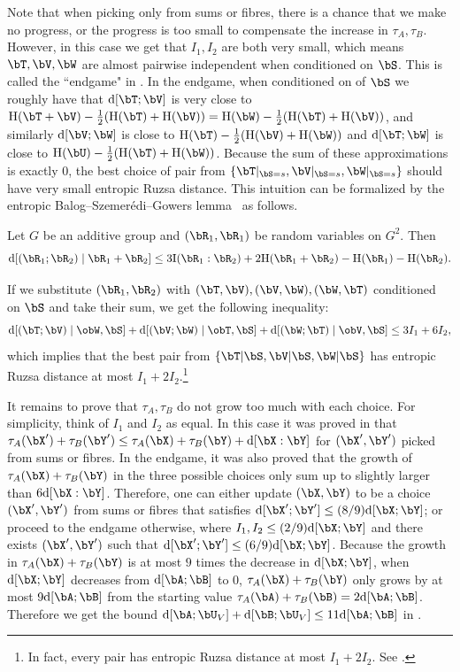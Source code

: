 \documentclass{article}
\DeclarePairedDelimiter{\paren}{(}{)}
\DeclarePairedDelimiter{\sqpar}{[}{]}
\newcommand{\ent}{\mathrm{H}\paren}
\newcommand{\info}{\mathrm{I}\paren}
\newcommand{\Ruz}{\mathrm{d}\sqpar}
\begin{document}
Note that when picking only from sums or fibres, there is a chance that we make no progress, or the progress is too small to compensate the increase in $\tau_A,\tau_B$. However, in this case we get that $I_1,I_2$ are both very small, which means $\bT,\bV,\bW$ are almost pairwise independent when conditioned on $\bS$. This is called the ``endgame" in \cite{GGMT23}. In the endgame, when conditioned on of $\bS$ we roughly have that $\Ruz{\bT;\bV}$ is very close to $\ent{\bT+\bV}-\frac{1}{2}(\ent{\bT}+\ent{\bV})=\ent{\bW}-\frac{1}{2}(\ent{\bT}+\ent{\bV})$, and similarly $\Ruz{\bV;\bW}$ is close to $\ent{\bT}-\frac{1}{2}(\ent{\bV}+\ent{\bW})$ and $\Ruz{\bT;\bW}$ is close to $\ent{\bU}-\frac{1}{2}(\ent{\bT}+\ent{\bW})$. Because the sum of these approximations is exactly $0$, the best choice of pair from $\{\bT|_{\bS=s},\bV|_{\bS=s},\bW|_{\bS=s}\}$ should have very small entropic Ruzsa distance. This intuition can be formalized by the entropic Balog–Szemer\'{e}di–Gowers lemma~\cite{Tao10,GGMT23} as follows.
\begin{lemma}
Let $G$ be an additive group and $(\bR_1,\bR_1)$ be random variables on $G^2$. Then 
$$\Ruz{(\bR_1;\bR_2)\mid \bR_1+\bR_2}\le 3\info{\bR_1:\bR_2}+2\ent{\bR_1+\bR_2}-\ent{\bR_1}-\ent{\bR_2}.$$
\end{lemma}
\noindent
If we substitute $(\bR_1,\bR_2)$ with $(\bT,\bV),(\bV,\bW),(\bW,\bT)$ conditioned on $\bS$ and take their sum, we get the following inequality:
\begin{equation}\label{eq:endgame}
\Ruz{(\bT;\bV)\mid \obW,\bS}+\Ruz{(\bV;\bW)\mid \obT,\bS}+\Ruz{(\bW;\bT)\mid\obV,\bS}\le 3I_1+6I_2,
\end{equation}
which implies that the best pair from $\{\bT|\bS,\bV|\bS,\bW|\bS\}$ has entropic Ruzsa distance at most $I_1+2I_2$.\footnote{In fact, every pair has entropic Ruzsa distance at most $I_1+2I_2$. See \cite[p.23]{GGMT23}.}

It remains to prove that $\tau_{A},\tau_{B}$ do not grow too much with each choice. For simplicity, think of $I_1$ and $I_2$ as equal. In this case it was proved in \cite{GGMT23} that $\tau_A(\bX')+\tau_B(\bY')\le \tau_A(\bX)+\tau_B(\bY)+\Ruz{\bX:\bY}$ for $(\bX',\bY')$ picked from sums or fibres. In the endgame, it was also proved that the growth of $\tau_A(\bX)+\tau_B(\bY)$ in the three possible choices only sum up to slightly larger than $6\Ruz{\bX:\bY}$. Therefore, one can either update $(\bX,\bY)$ to be a choice $(\bX',\bY')$ from sums or fibres that satisfies $\Ruz{\bX';\bY'}\le (8/9) \Ruz{\bX;\bY}$; or proceed to the endgame otherwise, where $I_1,I_2\le (2/9)\Ruz{\bX;\bY}$ and there exists $(\bX',\bY')$ such that $\Ruz{\bX';\bY'}\le (6/9)\Ruz{\bX;\bY}$. Because the growth in $\tau_A(\bX)+\tau_B(\bY)$ is at most $9$ times the decrease in $\Ruz{\bX;\bY}$, when $\Ruz{\bX;\bY}$ decreases from $\Ruz{\bA;\bB}$ to $0$, $\tau_A(\bX)+\tau_B(\bY)$ only grows by at most $9\Ruz{\bA;\bB}$ from the starting value $\tau_A(\bA)+\tau_B(\bB)=2\Ruz{\bA;\bB}$. Therefore we get the bound $\Ruz{\bA;\bU_V}+\Ruz{\bB;\bU_V}\le 11\Ruz{\bA;\bB}$ in \cite{GGMT23}.
\end{document}
